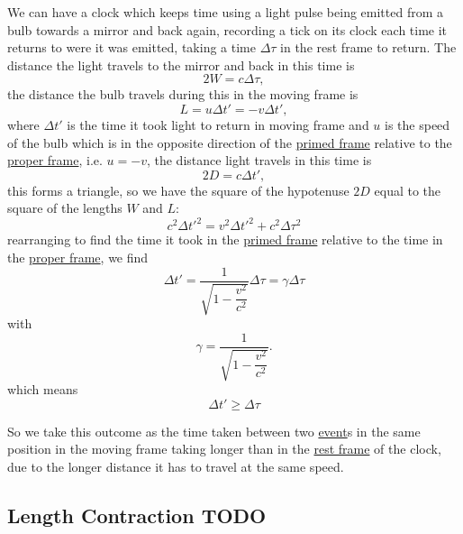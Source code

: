 We can have a clock which keeps time using a light pulse being emitted from a bulb towards a mirror and back again, recording a tick on its clock each time it returns to were it was emitted, taking a time $\Delta \tau$ in the rest frame to return. The distance the light travels to the mirror and back in this time is
\begin{equation}
	2W=c\Delta \tau,
\end{equation}
the distance the bulb travels during this in the moving frame is
\begin{equation}
	L=u\Delta t' = -v \Delta t',
\end{equation}
where $\Delta t'$ is the time it took light to return in moving frame and $u$ is the speed of the bulb which is in the opposite direction of the \hyperlink{def-Primed-Frame}{primed frame} relative to the \hyperlink{def-proper-frame}{proper frame}, i.e. $u=-v$, the distance light travels in this time is
\begin{equation}
	2D=c\Delta t',
\end{equation}
this forms a triangle, so we have the square of the hypotenuse $2D$ equal to the square of the lengths $W$ and $L$:
\begin{equation}%
	c^2 \Delta t'^2 = v^2 \Delta t'^2 + c^2\Delta \tau^2
\end{equation}%
rearranging to find the time it took in the \hyperlink{def-Primed-Frame}{primed frame} relative to the time in the \hyperlink{def-proper-frame}{proper frame}, we find
\begin{equation}%
	\Delta t' = \dfrac{1}{\sqrt{1-\dfrac{v^2}{c^2}}} \Delta \tau = \gamma \Delta \tau
\end{equation}%
with
\begin{equation}%
	\gamma =  \dfrac{1}{\sqrt{1-\dfrac{v^2}{c^2}}}.
\end{equation}%
which means
\begin{equation}%
	\Delta t' \geq \Delta \tau
\end{equation}%

So we take this outcome as the time taken between two \hyperlink{def-event}{event}s in the same position in the moving frame taking longer than in the \hyperlink{def-proper-frame}{rest frame} of the clock, due to the longer distance it has to travel at the same speed.


\subsection{Length Contraction TODO}

